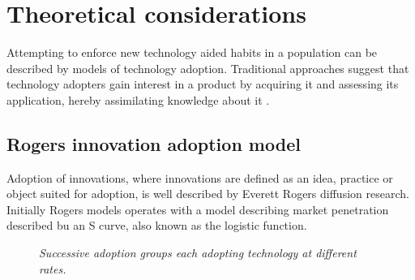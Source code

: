 \documentclass[conference]{IEEEtran}
\begin{document}
\section{Theoretical considerations}
Attempting to enforce new technology aided habits in a population can be described by models of technology adoption. 
Traditional approaches suggest that technology adopters gain interest in a product by acquiring it and assessing its application, hereby assimilating knowledge about it \cite{gilbert}.

\subsection{Rogers innovation adoption model}
Adoption of innovations, where innovations are defined as an idea, practice or object suited for adoption, is well described by Everett Rogers diffusion research.
Initially Rogers models \cite{rogers} operates with a model describing market penetration described bu an S curve, also known as the logistic function.


\begin{figure}
\caption{\textit{Successive adoption groups each adopting technology at different rates.}}			
\end{figure}
\end{document}
